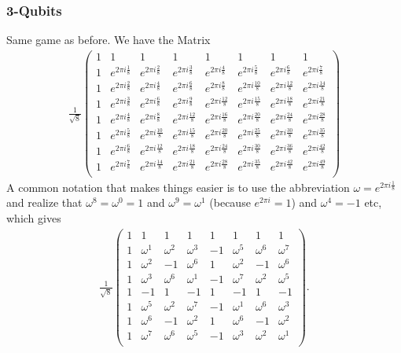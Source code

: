 \subsubsection*{3-Qubits}
Same game as before. We have the Matrix
\begin{align}
\frac{1}{\sqrt{8}}
    \begin{pmatrix}
1 & 1 & 1 & 1 & 1 & 1 & 1 & 1 \\
1 & e^{2\pi i \frac{1}{8}} & e^{2\pi i \frac{2}{8}} & e^{2\pi i \frac{3}{8}} & e^{2\pi i \frac{4}{8}} & e^{2\pi i \frac{5}{8}} & e^{2\pi i \frac{6}{8}} & e^{2\pi i \frac{7}{8}} \\
1 & e^{2\pi i \frac{2}{8}} & e^{2\pi i \frac{4}{8}} & e^{2\pi i \frac{6}{8}} & e^{2\pi i \frac{8}{8}} & e^{2\pi i \frac{10}{8}} & e^{2\pi i \frac{12}{8}} & e^{2\pi i \frac{14}{8}} \\
1 & e^{2\pi i \frac{3}{8}} & e^{2\pi i \frac{6}{8}} & e^{2\pi i \frac{9}{8}} & e^{2\pi i \frac{12}{8}} & e^{2\pi i \frac{15}{8}} & e^{2\pi i \frac{18}{8}} & e^{2\pi i \frac{21}{8}} \\
1 & e^{2\pi i \frac{4}{8}} & e^{2\pi i \frac{8}{8}} & e^{2\pi i \frac{12}{8}} & e^{2\pi i \frac{16}{8}} & e^{2\pi i \frac{20}{8}} & e^{2\pi i \frac{24}{8}} & e^{2\pi i \frac{28}{8}} \\
1 & e^{2\pi i \frac{5}{8}} & e^{2\pi i \frac{10}{8}} & e^{2\pi i \frac{15}{8}} & e^{2\pi i \frac{20}{8}} & e^{2\pi i \frac{25}{8}} & e^{2\pi i \frac{30}{8}} & e^{2\pi i \frac{35}{8}} \\
1 & e^{2\pi i \frac{6}{8}} & e^{2\pi i \frac{12}{8}} & e^{2\pi i \frac{18}{8}} & e^{2\pi i \frac{24}{8}} & e^{2\pi i \frac{30}{8}} & e^{2\pi i \frac{36}{8}} & e^{2\pi i \frac{42}{8}} \\
1 & e^{2\pi i \frac{7}{8}} & e^{2\pi i \frac{14}{8}} & e^{2\pi i \frac{21}{8}} & e^{2\pi i \frac{28}{8}} & e^{2\pi i \frac{35}{8}} & e^{2\pi i \frac{42}{8}} & e^{2\pi i \frac{49}{8}} \\
    \end{pmatrix}
\end{align}
A common notation that makes things easier is to use the abbreviation $\omega = e^{2\pi i \frac{1}{8}} $ and realize that $\omega^8 = \omega^0 = 1$ and $\omega^9 = \omega^1$ (because $e^{2\pi i}=1$) and $\omega^4 = -1$ etc, which gives
\begin{align}
\frac{1}{\sqrt{8}}
\begin{pmatrix}
1 & 1 & 1 & 1 & 1 & 1 & 1 & 1 \\
1 & \omega^1 & \omega^2 & \omega^3 & -1 & \omega^5 & \omega^6& \omega^7 \\
1 & \omega^2 & -1 & \omega^6 & 1 & \omega^2 & -1 &\omega^6 \\
1 & \omega^3 & \omega^6 & \omega^1 & -1 & \omega^7 & \omega^2& \omega^5 \\
1 & -1 & 1 & -1 & 1 & -1 & 1 & -1 \\
1 & \omega^5 & \omega^2 & \omega^7 & -1 & \omega^1 & \omega^6& \omega^3 \\
1 & \omega^6 & -1 & \omega^2 & 1 & \omega^6 & -1 &\omega^2 \\
1 & \omega^7 & \omega^6 & \omega^5 & -1 & \omega^3 & \omega^2 & \omega^1 \\
 \end{pmatrix}.
\end{align}
